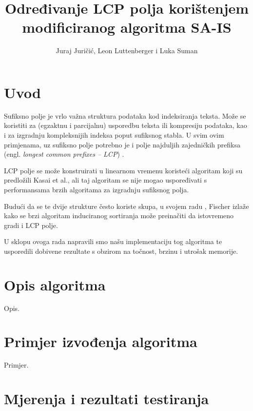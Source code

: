 \documentclass[times, utf8, proizvoljni, numeric]{fer}
\begin{document}
\nocite{*}

\title{Određivanje LCP polja korištenjem modificiranog algoritma SA-IS}

\author{Juraj Juričić, Leon Luttenberger i Luka Suman}

\maketitle

\tableofcontents

\chapter{Uvod}
Sufiksno polje je vrlo važna struktura podataka kod indeksiranja teksta. Može se koristiti za (egzaktnu i parcijalnu) usporedbu teksta ili kompresiju podataka, kao i za izgradnju kompleksnijih indeksa poput sufiksnog stabla. U svim ovim primjenama, uz sufiksno polje potrebno je i polje najduljih zajedničkih prefiksa (engl. \textit{longest common prefixes -- LCP}) \citep{fischer2011inducing}.

LCP polje se može konstruirati u linearnom vremenu koristeći algoritam koji su predložili Kasai et al.\citep{kasai2001linear}, ali taj algoritam se nije mogao uspoređivati s performansama brzih algoritama za izgradnju sufiksnog polja.

Budući da se te dvije strukture često koriste skupa, u svojem radu \citep{fischer2011inducing}, Fischer izlaže kako se brzi algoritam induciranog sortiranja može preinačiti da istovremeno gradi i LCP polje.

U sklopu ovoga rada napravili smo našu implementaciju tog algoritma te usporedili dobivene rezultate s obzirom na točnost, brzinu i utrošak memorije.

\chapter{Opis algoritma}
Opis.

\chapter{Primjer izvođenja algoritma}
Primjer.

\chapter{Mjerenja i rezultati testiranja}
\end{document}
